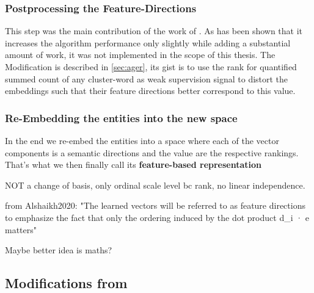 
\subsubsection{Postprocessing the Feature-Directions}
\label{sec:algo:postprocess}

This step was the main contribution of the work of \textcite{Ager2018}. As has been shown that it increases the algorithm performance only slightly while adding a substantial amount of work, it was not implemented in the scope of this thesis. The Modification is described in \autoref{sec:ager}, its gist is to use the rank for quantified summed count of any cluster-word as weak supervision signal to distort the embeddings such that their feature directions better correspond to this value.

\subsubsection{Re-Embedding the entities into the new space}
\label{sec:algo:reembed}

In the end we re-embed the entities into a space where each of the vector components is a semantic directions and the value are the respective \gls{rank}ings. That's what we then finally call its \textbf{feature-based representation} 

NOT a change of basis, only ordinal scale level bc rank, no linear independence.

from Alshaikh2020: "The learned vectors will be referred to as feature directions to emphasize the fact that only the ordering induced by the dot product d_i · e matters"

Maybe better idea is maths?






\subsection{Modifications from \textcite{Ager2018,Alshaikh2020}}

\subsubsection{\textcite{Ager2018}}
\label{sec:ager}


